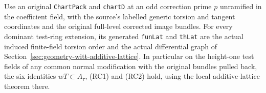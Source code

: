 \begin{corollary}
\label{cor:geometry-original-chart-identity}
Use an original \texttt{ChartPack} and \texttt{chartD}
at an odd correction prime \(p\) unramified in the coefficient
field, with the source's labelled generic torsion and tangent
coordinates and the original full-level corrected image bundles.
For every dominant test-ring extension, its generated
\texttt{funLat} and \texttt{thLat} are the actual induced
finite-field torsion order and the actual differential graph
of Section~\ref{sec:geometry-witt-additive-lattice}.
In particular on the height-one test fields of any common
normal modification with the original bundles pulled back,
the six identities \(wT\subset A_\tau\), (RC1) and (RC2) hold,
using the local additive-lattice theorem there.
\end{corollary}

